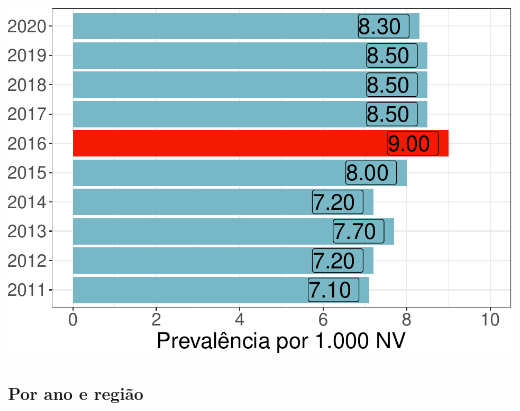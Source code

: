 \documentclass[
]{article}
\begin{document}
\includegraphics{anom_files/figure-latex/unnamed-chunk-28-1.pdf}

\hypertarget{por-ano-e-regiuxe3o}{%
\subsubsection{Por ano e região}\label{por-ano-e-regiuxe3o}}
\end{document}
